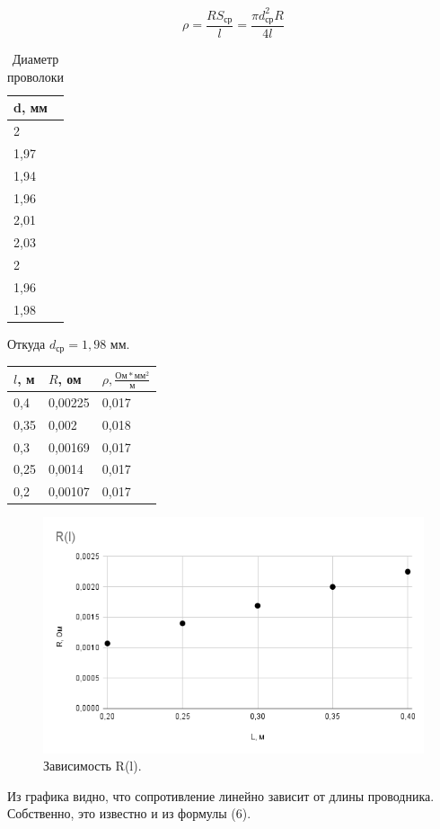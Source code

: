 \documentclass[a4paper,12pt]{article}
\begin{document}
\begin{equation}
    \rho = \frac{RS_{ср}}{l} = \frac{\pi d_{ср}^2 R}{4l}
\end{equation}


\begin{table}[ht!]
    \centering
    \begin{tabular}{|l|}
    \hline
        d, мм\\ \hline
        2    \\ \hline   
        1,97 \\ \hline
        1,94 \\ \hline
        1,96 \\ \hline
        2,01 \\ \hline
        2,03 \\ \hline
        2    \\ \hline
        1,96 \\ \hline
        1,98 \\ \hline
    \end{tabular}
    \caption{Диаметр проволоки}
\end{table}
Откуда $d_{ср} = 1,98$ мм.

\begin{table}[!ht]
    \centering
    \begin{tabular}{|l|l|l|}
    \hline
        $l$, м & $R$, ом & $\rho, \frac{Ом*мм^2}{м}$ \\ \hline
        0,4 & 0,00225 & 0,017 \\ \hline
        0,35 & 0,002 & 0,018 \\ \hline
        0,3 & 0,00169 & 0,017 \\ \hline
        0,25 & 0,0014 & 0,017 \\ \hline
        0,2 & 0,00107 & 0,017 \\ \hline
    \end{tabular}
\end{table}
\clearpage

\begin{figure}[ht!]
	\begin{center}
		\includegraphics[scale=0.6]{R(l).png}
	\end{center}
	\caption{Зависимость R(l).}
\end{figure}

Из графика видно, что сопротивление линейно зависит от длины проводника. Собственно, это известно и из формулы (6).
\end{document}
